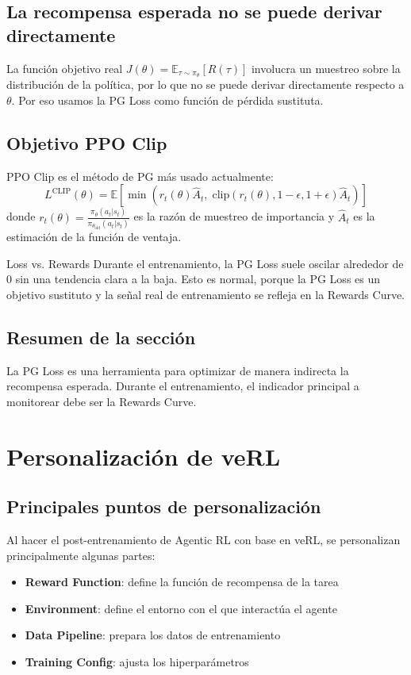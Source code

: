\documentclass[a4paper]{article}
\begin{document}
\subsection{La recompensa esperada no se puede derivar directamente}
La función objetivo real $J(\theta) = \mathbb{E}_{\tau \sim \pi_\theta}[R(\tau)]$ involucra un muestreo sobre la distribución de la política, por lo que no se puede derivar directamente respecto a $\theta$. Por eso usamos la PG Loss como función de pérdida sustituta.

\subsection{Objetivo PPO Clip}
PPO Clip es el método de PG más usado actualmente:
$$L^{\text{CLIP}}(\theta) = \mathbb{E}\left[\min\left(r_t(\theta) \hat{A}_t, \; \text{clip}(r_t(\theta), 1-\epsilon, 1+\epsilon) \hat{A}_t\right)\right]$$
donde $r_t(\theta) = \frac{\pi_\theta(a_t|s_t)}{\pi_{\theta_{\text{old}}}(a_t|s_t)}$ es la razón de muestreo de importancia y $\hat{A}_t$ es la estimación de la función de ventaja.

\begin{warningbox}{Loss vs. Rewards}
Durante el entrenamiento, la PG Loss suele oscilar alrededor de 0 sin una tendencia clara a la baja. Esto es normal, porque la PG Loss es un objetivo sustituto y la señal real de entrenamiento se refleja en la Rewards Curve.
\end{warningbox}

\subsection{Resumen de la sección}
La PG Loss es una herramienta para optimizar de manera indirecta la recompensa esperada. Durante el entrenamiento, el indicador principal a monitorear debe ser la Rewards Curve.

\section{Personalización de veRL}
\subsection{Principales puntos de personalización}
Al hacer el post-entrenamiento de Agentic RL con base en veRL, se personalizan principalmente algunas partes:
\begin{itemize}
  \item \textbf{Reward Function}: define la función de recompensa de la tarea
  \item \textbf{Environment}: define el entorno con el que interactúa el agente
  \item \textbf{Data Pipeline}: prepara los datos de entrenamiento
  \item \textbf{Training Config}: ajusta los hiperparámetros
\end{itemize}
\end{document}
